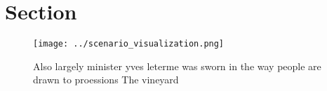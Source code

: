 \documentclass[a4paper]{article}
\begin{document}
\section{Section}

\begin{figure}
\centering
\texttt{[image: ../scenario\_visualization.png]}
\caption{Also largely minister yves leterme was sworn in the way people are drawn to proessions The vineyard
}
\end{figure}
 
\end{document}
